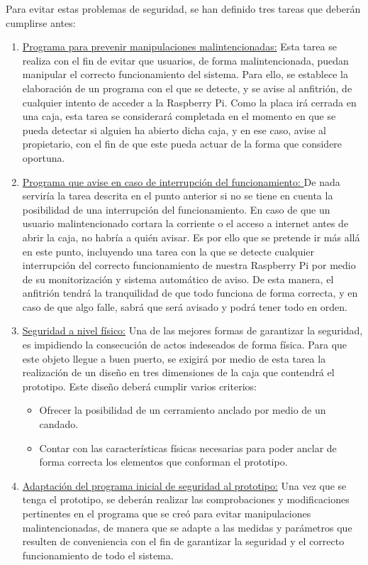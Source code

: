 Para evitar estas problemas de seguridad, se han definido tres tareas que deberán cumplirse antes:
\begin{enumerate}
\item \underline{Programa para prevenir manipulaciones malintencionadas:} Esta tarea se realiza con el fin de evitar que usuarios, de forma malintencionada, puedan manipular el correcto funcionamiento del sistema. Para ello, se establece la elaboración de un programa con el que se detecte, y se avise al anfitrión, de cualquier intento de acceder a la Raspberry Pi. Como la placa irá cerrada en una caja, esta tarea se considerará completada en el momento en que se pueda detectar si alguien ha abierto dicha caja, y en ese caso, avise al propietario, con el fin de que este pueda actuar de la forma que considere oportuna.
\item \underline{Programa que avise en caso de interrupción del funcionamiento: } De nada serviría la tarea descrita en el punto anterior si no se tiene en cuenta la posibilidad de una interrupción del funcionamiento. En caso de que un usuario malintencionado cortara la corriente o el acceso a internet antes de abrir la caja, no habría a quién avisar. Es por ello que se pretende ir más allá en este punto, incluyendo una tarea con la que se detecte cualquier interrupción del correcto funcionamiento de nuestra Raspberry Pi por medio de su monitorización y sistema automático de aviso. De esta manera, el anfitrión tendrá la tranquilidad de que todo funciona de forma correcta, y en caso de que algo falle, sabrá que será avisado y podrá tener todo en orden.
\item \underline{Seguridad a nivel físico:} Una de las mejores formas de garantizar la seguridad, es impidiendo la consecución de actos indeseados de forma física. Para que este objeto llegue a buen puerto, se exigirá por medio de esta tarea la realización de un diseño en tres dimensiones de la caja que contendrá el prototipo. Este diseño deberá cumplir varios criterios:
\begin{itemize}
\item{Ofrecer la posibilidad de un cerramiento anclado por medio de un candado.}
\item{Contar con las características físicas necesarias para poder anclar de forma correcta los elementos que conforman el prototipo.}
\end{itemize}
\item \underline{Adaptación del programa inicial de seguridad al prototipo:} Una vez que se tenga el prototipo, se deberán realizar las comprobaciones y modificaciones pertinentes en el programa que se creó para evitar manipulaciones malintencionadas, de manera que se adapte a las medidas y parámetros que resulten de conveniencia con el fin de garantizar la seguridad y el correcto funcionamiento de todo el sistema.
\end{enumerate}

